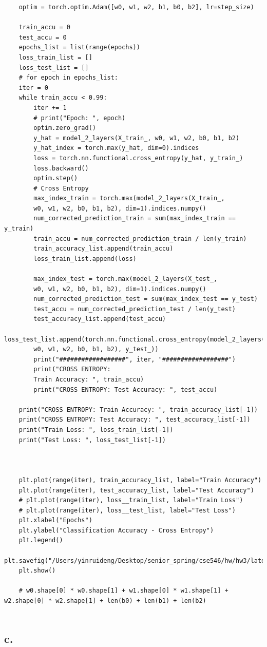 \documentclass{article}
\begin{document}
\begin{verbatim}
	optim = torch.optim.Adam([w0, w1, w2, b1, b0, b2], lr=step_size)
	
	train_accu = 0
	test_accu = 0
	epochs_list = list(range(epochs))
	loss_train_list = []
	loss_test_list = []
	# for epoch in epochs_list:
	iter = 0
	while train_accu < 0.99:
		iter += 1
		# print("Epoch: ", epoch)
		optim.zero_grad()
		y_hat = model_2_layers(X_train_, w0, w1, w2, b0, b1, b2)
		y_hat_index = torch.max(y_hat, dim=0).indices
		loss = torch.nn.functional.cross_entropy(y_hat, y_train_)
		loss.backward()
		optim.step()
		# Cross Entropy
		max_index_train = torch.max(model_2_layers(X_train_, 
		w0, w1, w2, b0, b1, b2), dim=1).indices.numpy()
		num_corrected_prediction_train = sum(max_index_train == y_train)
		train_accu = num_corrected_prediction_train / len(y_train)
		train_accuracy_list.append(train_accu)
		loss_train_list.append(loss)
		
		max_index_test = torch.max(model_2_layers(X_test_, 
		w0, w1, w2, b0, b1, b2), dim=1).indices.numpy()
		num_corrected_prediction_test = sum(max_index_test == y_test)
		test_accu = num_corrected_prediction_test / len(y_test)
		test_accuracy_list.append(test_accu)
		loss_test_list.append(torch.nn.functional.cross_entropy(model_2_layers(X_test_, 
		w0, w1, w2, b0, b1, b2), y_test_))
		print("##################", iter, "##################")
		print("CROSS ENTROPY: 
		Train Accuracy: ", train_accu)
		print("CROSS ENTROPY: Test Accuracy: ", test_accu)
		
	print("CROSS ENTROPY: Train Accuracy: ", train_accuracy_list[-1])
	print("CROSS ENTROPY: Test Accuracy: ", test_accuracy_list[-1])
	print("Train Loss: ", loss_train_list[-1])
	print("Test Loss: ", loss_test_list[-1])
	
	
	
	plt.plot(range(iter), train_accuracy_list, label="Train Accuracy")
	plt.plot(range(iter), test_accuracy_list, label="Test Accuracy")
	# plt.plot(range(iter), loss__train_list, label="Train Loss")
	# plt.plot(range(iter), loss__test_list, label="Test Loss")
	plt.xlabel("Epochs")
	plt.ylabel("Classification Accuracy - Cross Entropy")
	plt.legend()
	plt.savefig("/Users/yinruideng/Desktop/senior_spring/cse546/hw/hw3/latex/plots/A5b.png")
	plt.show()
	
	# w0.shape[0] * w0.shape[1] + w1.shape[0] * w1.shape[1] + w2.shape[0] * w2.shape[1] + len(b0) + len(b1) + len(b2)


\end{verbatim}


\subsection*{c.}
\end{document}
